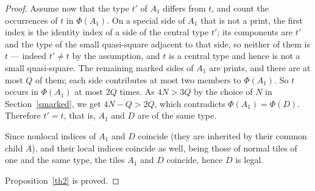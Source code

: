 \documentclass[10pt,a4paper]{amsart}
\begin{document}
\begin{proof}
Assume now that the type $t'$ of $A_1$ differs from $t$, and count the occurrences of $t$ in
$\Phi(A_1)$. On a special side of $A_1$ that is not a print, the first index is the identity index
of a side of the central type $t'$; its components are $t'$ and the type of the small quasi-square
adjacent to that side, so neither of them is $t$ --- indeed $t'\ne t$ by the assumption, and $t$ is
a central type and hence is not a small quasi-square. The remaining marked sides of $A_1$ are
prints, and there are at most $Q$ of them; each side contributes at most two members to
$\Phi(A_1)$. So $t$ occurs in $\Phi(A_1)$ at most $2Q$ times. As $4N>3Q$ by the choice of $N$ in
Section~\ref{smarked}, we get $4N-Q>2Q$, which contradicts $\Phi(A_1)=\Phi(D)$. Therefore $t'=t$,
that is, $A_1$ and $D$ are of the same type.

Since  nonlocal indices of $A_1$ and $D$ coincide (they are inherited by their common child  $A$),
and their local indices coincide as well, being those of normal tiles of one and the same type,
the tiles $A_1$ and $D$ coincide, hence $D$ is legal.

Proposition~\ref{th2} is proved.
\end{proof}
\end{document}
